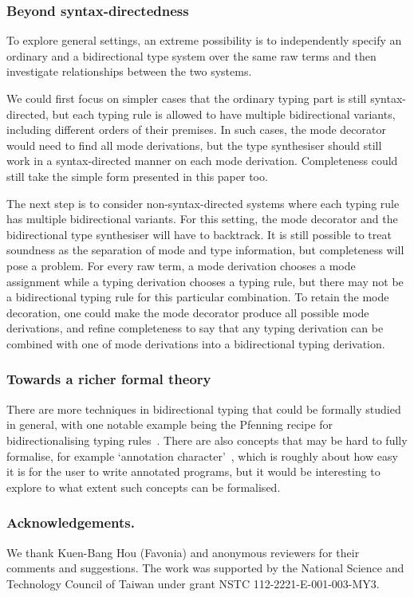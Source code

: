 \subsubsection{Beyond syntax-directedness}

To explore general settings, an extreme possibility is to independently specify an ordinary and a bidirectional type system over the same raw terms and then investigate relationships between the two systems.

We could first focus on simpler cases that the ordinary typing part is still syntax-directed, but each typing rule is allowed to have multiple bidirectional variants, including different orders of their premises.
In such cases, the mode decorator would need to find all mode derivations, but the type synthesiser should still work in a syntax-directed manner on each mode derivation.
Completeness could still take the simple form presented in this paper too.

The next step is to consider non-syntax-directed systems where each typing rule has multiple bidirectional variants.
For this setting, the mode decorator and the bidirectional type synthesiser will have to backtrack.
It is still possible to treat soundness as the separation of mode and type information, but completeness will pose a problem.
For every raw term, a mode derivation chooses a mode assignment while a typing derivation chooses a typing rule, but there may not be a bidirectional typing rule for this particular combination.
To retain the mode decoration, one could make the mode decorator produce all possible mode derivations, and refine completeness to say that any typing derivation can be combined with one of mode derivations into a bidirectional typing derivation.


\subsubsection{Towards a richer formal theory}

There are more techniques in bidirectional typing that could be formally studied in general, with one notable example being the Pfenning recipe for bidirectionalising typing rules~\citep[Section~4]{Dunfield2021}.
There are also concepts that may be hard to fully formalise, for example `annotation character'~\citep[Section~3.4]{Dunfield2021}, which is roughly about how easy it is for the user to write annotated programs, but it would be interesting to explore to what extent such concepts can be formalised.

\begin{credits}
\subsubsection{Acknowledgements.}
We thank Kuen-Bang {Hou (Favonia)} and anonymous reviewers for their comments and suggestions.
The work was supported by the National Science and Technology Council of Taiwan under grant NSTC 112-2221-E-001-003-MY3.
\end{credits}
